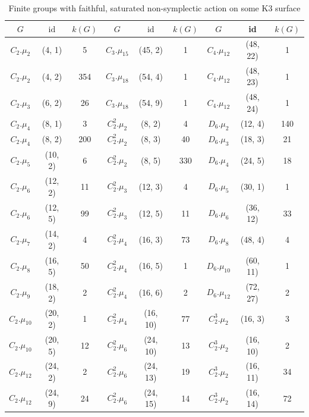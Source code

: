 \renewcommand{\arraystretch}{1.2}
{\small
\begin{longtable}{ccc|ccc|ccc}
  \caption{Finite groups with faithful, saturated non-symplectic action on some K3 surface}\label{table:action}\\
  $G$&$\mathrm{id} $& $k(G)$ & $G$&$\mathrm{id} $& $k(G)$ & $G$ & id & $k(G)$ \\
  \hline
  \endhead
\rowcolor{lightgray}
$C_2.\mu_{2}$&(4, 1)&5 & $C_3.\mu_{15}$&(45, 2)&1   &  $C_4.\mu_{12}$&(48, 22)&1\\
$C_2.\mu_{2}$&(4, 2)&354 & $C_3.\mu_{18}$&(54, 4)&1   &  $C_4.\mu_{12}$&(48, 23)&1\\
\rowcolor{lightgray}
$C_2.\mu_{3}$&(6, 2)&26 & $C_3.\mu_{18}$&(54, 9)&1   &  $C_4.\mu_{12}$&(48, 24)&1\\
$C_2.\mu_{4}$&(8, 1)&3 & $C_2^2.\mu_{2}$&(8, 2)&4   &  $D_6.\mu_{2}$&(12, 4)&140\\
\rowcolor{lightgray}
$C_2.\mu_{4}$&(8, 2)&200 & $C_2^2.\mu_{2}$&(8, 3)&40   &  $D_6.\mu_{3}$&(18, 3)&21\\
$C_2.\mu_{5}$&(10, 2)&6 & $C_2^2.\mu_{2}$&(8, 5)&330  &  $D_6.\mu_{4}$&(24, 5)&18\\
\rowcolor{lightgray}
$C_2.\mu_{6}$&(12, 2)&11 & $C_2^2.\mu_{3}$&(12, 3)&4  &  $D_6.\mu_{5}$&(30, 1)&1\\
$C_2.\mu_{6}$&(12, 5)&99 & $C_2^2.\mu_{3}$&(12, 5)&11  &  $D_6.\mu_{6}$&(36, 12)&33\\
\rowcolor{lightgray}
$C_2.\mu_{7}$&(14, 2)&4 & $C_2^2.\mu_{4}$&(16, 3)&73 & $D_6.\mu_{8}$&(48, 4)&4\\
$C_2.\mu_{8}$&(16, 5)&50 & $C_2^2.\mu_{4}$&(16, 5)&1 & $D_6.\mu_{10}$&(60, 11)&1\\
\rowcolor{lightgray}
$C_2.\mu_{9}$&(18, 2)&2 & $C_2^2.\mu_{4}$&(16, 6)&2 & $D_6.\mu_{12}$&(72, 27)&2\\
$C_2.\mu_{10}$&(20, 2)&1 & $C_2^2.\mu_{4}$&(16, 10)&77 & $C_2^3.\mu_{2}$&(16, 3)&3\\
\rowcolor{lightgray}
$C_2.\mu_{10}$&(20, 5)&12 & $C_2^2.\mu_{6}$&(24, 10)&13 & $C_2^3.\mu_{2}$&(16, 10)&2\\
$C_2.\mu_{12}$&(24, 2)&2 & $C_2^2.\mu_{6}$&(24, 13)&19 & $C_2^3.\mu_{2}$&(16, 11)&34\\
\rowcolor{lightgray}
$C_2.\mu_{12}$&(24, 9)&24 & $C_2^2.\mu_{6}$&(24, 15)&14 & $C_2^3.\mu_{2}$&(16, 14)&72\\

\end{longtable}}

